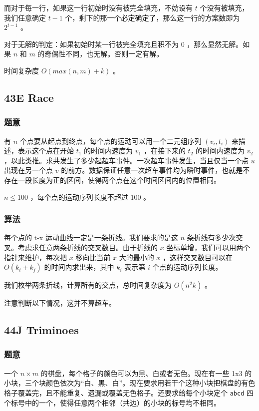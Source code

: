 \documentclass[11pt]{article}
\begin{document}
    而对于每一行，如果这一行初始时没有被完全填充，不妨设有 $t$ 个没有被填充，我们任意确定 $t - 1$ 个，剩下的那一个必定确定了，那么这一行的方案数即为 $2^{t - 1}$ 。

    对于无解的判定：如果初始时某一行被完全填充且积不为 0 ，那么显然无解。如果 $n$ 和 $m$ 的奇偶性不同，也无解。否则一定有解。

    时间复杂度 $O(max (n, m) + k)$ 。
\subsection{43E   Race}
\label{sec-3-5}
\subsubsection{题意}
\label{sec-3-5-1}

    有 $n$ 个点要从起点到终点，每个点的运动可以用一个二元组序列 $(v_i, t_i)$ 来描述，表示这个点在开始 $t_1$ 的时间内速度为 $v_1$ ，在接下来的 $t_2$ 的时间内速度为 $v_2$ ，以此类推。求共发生了多少起超车事件。一次超车事件发生，当且仅当一个点 $u$ 出现在另一个点 $v$ 的前方。数据保证任意一次超车事件均为瞬时事件，也就是不存在一段长度为正的区间，使得两个点在这个时间区间内的位置相同。

    $n \leq 100$ ，每个点的运动序列长度不超过 100 。
\subsubsection{算法}
\label{sec-3-5-2}

    每个点的 t-x 运动曲线一定是一条折线。我们要求的是这 $n$ 条折线有多少次交叉。考虑求任意两条折线的交叉数目。由于折线的 $x$ 坐标单增，我们可以用两个指针来维护，每次把 $x$ 移向比当前 $x$ 大的最小的 $x$ ，这样交叉数目可以在 $O(k_i + k_j)$ 的时间内求出来，其中 $k_i$ 表示第 $i$ 个点的运动序列长度。

    我们枚举两条折线，计算所有的交点，总时间复杂度为 $O(n^2 k)$ 。

    注意判断以下情况，这并不算超车。


\subsection{44J   Triminoes}
\label{sec-3-6}
\subsubsection{题意}
\label{sec-3-6-1}

    一个 $n \times m$ 的棋盘，每个格子的颜色可以为黑、白或者无色。现在有一些 1x3 的小块，三个块颜色依次为“白、黑、白”。现在要求用若干个这种小块把棋盘的有色格子覆盖完，且不能重复、遗漏或覆盖无色格子。还要求给每个小块定个 \texttt{abcd} 四个标号中的一个，使得任意两个相邻（共边）的小块的标号均不相同。
\end{document}
